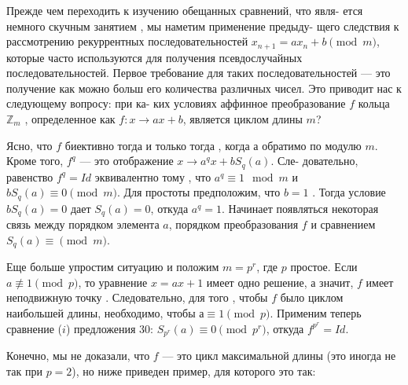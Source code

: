 Прежде чем переходить к изучению обещанных сравнений, что явля­-\linebreak
ется немного скучным занятием , мы наметим применение предыду­-\linebreak
щего следствия к рассмотрению рекуррентных последовательностей\linebreak
$x_{n+1} = ax_n+b \pmod{m}$, которые часто используются для получения\linebreak
псевдослучайных последовательностей. Первое требование для таких\linebreak
последовательностей — это получение как можно больш его количества\linebreak
различных чисел. Это приводит нас к следующему вопросу: при ка-\linebreak
ких условиях аффинное преобразование $f$ кольца $\mathbb{Z}_m$ , определенное как\linebreak
$f:x\rightarrow ax+b$, является циклом длины $m$?

Ясно, что $f$ биективно тогда и только тогда , когда $а$ обратимо по\linebreak
модулю $m$. Кроме того, $f^q$ — это отображение $x \rightarrow a^qx + bS_q(a)$. Сле­-\linebreak
довательно, равенство $f^q = Id$ эквивалентно тому , что $a^q \equiv 1 \mod{m}$\linebreak
и $bS_q(a) \equiv 0 \pmod{m}$. Для простоты предположим, что $b = 1$ . Тогда\linebreak
условие $bS_q(a) = 0$ дает $S_q(a) = 0$, откуда $a^q = 1$. Начинает появляться\linebreak
некоторая связь между порядком элемента $a$, порядком преобразования\linebreak
$f$ и сравнением $S_q(a)\equiv \pmod{m}$.

Еще больше упростим ситуацию и положим $m = p^r$, где $p$ простое.\linebreak
Если $a \not\equiv 1 \pmod{p}$, то уравнение $x = ax + 1$ имеет одно решение, а\linebreak
значит, $f$ имеет неподвижную точку . Следовательно, для того , чтобы\linebreak
$f$ было циклом наибольшей длины, необходимо, чтобы $а \equiv 1 \pmod{p}$.\linebreak
Применим теперь сравнение ($i$) предложения 30: $S_{p^r}(a) \equiv 0 \pmod{p^r}$,\linebreak
откуда $f^{p^r} = Id$.

Конечно, мы не доказали, что $f$ — это цикл максимальной длины\linebreak
(это иногда не так при $p = 2$), но ниже приведен пример, для которого
это так:


